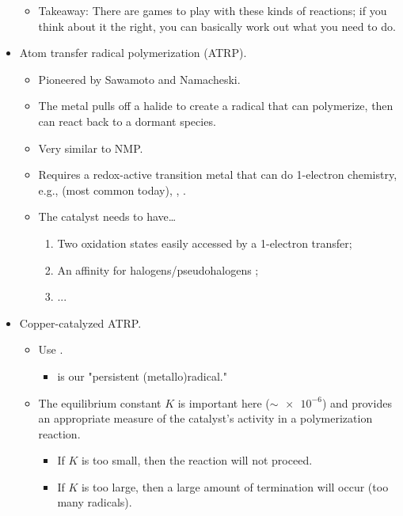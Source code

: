 \documentclass[../notes.tex]{subfiles}
\begin{document}
\begin{itemize}
\begin{itemize}
\begin{itemize}
        \end{itemize}
        \item Takeaway: There are games to play with these kinds of reactions; if you think about it the right, you can basically work out what you need to do.
    \end{itemize}
    \item Atom transfer radical polymerization (ATRP).
    \begin{itemize}
        \item Pioneered by Sawamoto and Namacheski.
        \item The metal pulls off a halide to create a radical that can polymerize, then can react back to a dormant species.
        \item Very similar to NMP.
        \item Requires a redox-active transition metal that can do 1-electron chemistry, e.g.,  (most common today), , .
        \item The catalyst needs to have\dots
        \begin{enumerate}
            \item Two oxidation states easily accessed by a 1-electron transfer;
            \item An affinity for halogens/pseudohalogens ;
            \item ...
        \end{enumerate}
    \end{itemize}
    \item Copper-catalyzed ATRP.
    \begin{itemize}
        \item Use .
        \begin{itemize}
            \item {} is our "persistent (metallo)radical."
        \end{itemize}
        \item The equilibrium constant $K$ is important here ($\sim\num{e-6}$) and provides an appropriate measure of the catalyst's activity in a polymerization reaction.
        \begin{itemize}
            \item If $K$ is too small, then the reaction will not proceed.
            \item If $K$ is too large, then a large amount of termination will occur (too many radicals).
        \end{itemize}

\end{itemize}
\end{itemize}
\end{document}
